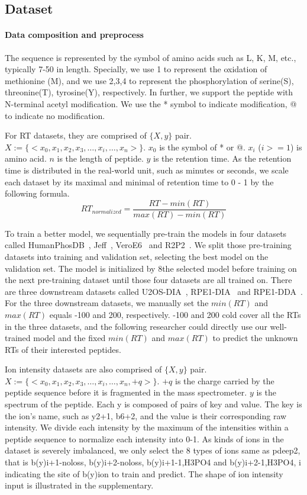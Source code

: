 
\subsection{Dataset}
\paragraph*{Data composition and preprocess}
The sequence is represented by the symbol of amino acids such as L, K, M, etc., typically 7-50 in length. Specially, we use 1 to represent the oxidation of methionine (M), and we use 2,3,4 to represent the phosphorylation of serine(S), threonine(T), tyrosine(Y), respectively. In further, we support the peptide with N-terminal acetyl modification. We use the * symbol to indicate modification, @ to indicate no modification. 

For RT datasets, they are comprised of \( \{X, y\} \) pair. 
$X:= \{ <x_0, x_1, x_2, x_3,\dots, x_i, \dots, x_n>\}$. $x_0$ is the symbol of * or @. 
$x_i$ ($i>= 1$) is amino acid. $n$ is the length of peptide. \( y \) is the retention time. 
As the retention time is distributed in the real-world unit, such as minutes or seconds, we scale each dataset by its maximal and minimal of retention time to 0 - 1 by the following formula. 
\[RT_{normalized} = \frac{RT-min(RT)}{max(RT)-min(RT)}\]

To train a better model, we sequentially pre-train the models in four datasets called 
HumanPhosDB~\cite{lawrence2016plug}, Jeff~\cite{liu2018vivo}, VeroE6~\cite{bouhaddou2020global}
and R2P2~\cite{leutert2019r2}. We split those pre-training datasets into training and validation set, selecting the best model on the validation set. The model is initialized by 8the selected model before training on the next pre-training dataset until those four datasets are all trained on. There are three downstream datasets called U2OS-DIA~\cite{wang2020naguider}, RPE1-DIA~\cite{bekker2020rapid} and RPE1-DDA~\cite{bekker2020rapid}. For the three downstream datasets, we manually set the $min(RT)$ and $max(RT)$ equals -100 and 200, respectively. -100 and 200 cold cover all the RTs in the three datasets, and the following researcher could directly use our well-trained model and the fixed $min(RT)$ and $max(RT)$ to predict the unknown RTs of their interested peptides.

Ion intensity datasets are also comprised of \( \{X, y\} \) pair. 
$X := \{ <x_0, x_1, x_2, x_3,\dots, x_i, \dots, x_n, +q> \}$. $+q$
is the charge carried by the peptide sequence before it is fragmented in the mass spectrometer. \( y \) is the spectrum of the peptide. Each y is composed of pairs of key and value.
The key is the ion's name, such as y2+1, b6+2, and the value is their corresponding raw intensity.
We divide each intensity by the maximum of the intensities within a peptide sequence to normalize each intensity into 0-1. As kinds of ions in the dataset is severely imbalanced, we only select the 8 types of ions same as pdeep2, that is b(y)i+1-noloss, b(y)i+2-noloss, b(y)i+1-1,H3PO4 and b(y)i+2-1,H3PO4, i indicating the site of b(y)ion to train and predict. The shape of ion intensity input is illustrated in the supplementary.

